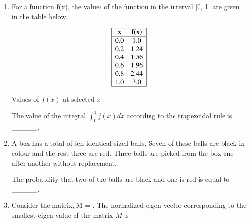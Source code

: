 \documentclass[journal]{IEEEtran}
\begin{document}
\begin{enumerate}
    \hfill{}
    
    \item For a function f(x), the values of the function in the interval [0, 1] are given in the table below.
    
    \begin{table}[h!]
\centering
\[
\begin{array}{|c|c|}
\hline
\textbf{x} & \textbf{f(x)} \\
\hline
0.0 & 1.0 \\
0.2 & 1.24 \\
0.4 & 1.56 \\
0.6 & 1.96 \\
0.8 & 2.44 \\
1.0 & 3.0 \\
\hline
\end{array}
\]
\caption{Values of $f(x)$ at selected $x$}
\label{tab:fx}
\end{table}

    
    The value of the integral $\int_{0}^{1} f(x) dx$ according to the trapezoidal rule is \_\_\_\_\_.
    
    \hfill{}
    
    \item A box has a total of ten identical sized balls. Seven of these balls are black in colour and the rest three are red. Three balls are picked from the box one after another without replacement.
    
    The probability that two of the balls are black and one is red is equal to \_\_\_\_\_.
    
    \hfill{}
    
    \item Consider the matrix, M = . The normalized eigen-vector corresponding to the smallest eigen-value of the matrix $M$ is  
    
    \begin{enumerate}  \end{enumerate}              
    

\end{enumerate}
\end{document}

